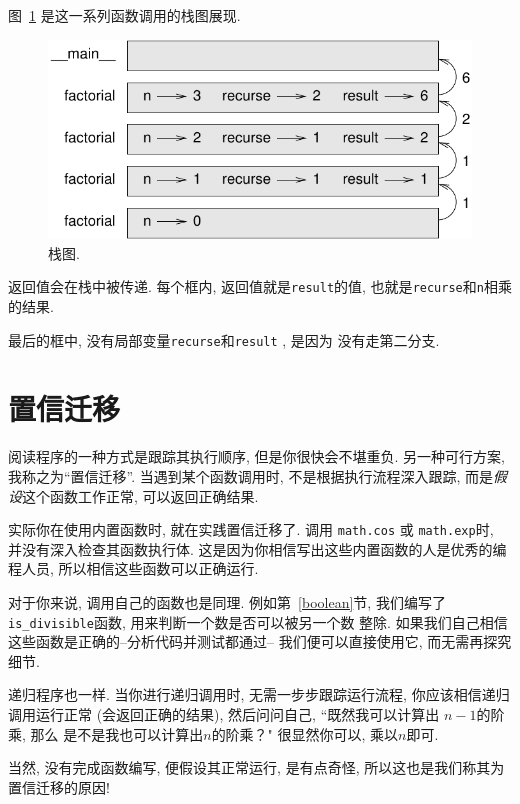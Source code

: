 \documentclass[10pt]{book}
\begin{document}
图~\ref{fig.stack3} 是这一系列函数调用的栈图展现.

\begin{figure}
\centerline
{\includegraphics[scale=0.8]{figs/stack3.pdf}}
\caption{栈图.}
\label{fig.stack3}
\end{figure}

返回值会在栈中被传递. 
每个框内, 返回值就是{\tt result}的值, 也就是{\tt recurse}和{\tt n}相乘的结果. 

最后的框中, 没有局部变量{\tt recurse}和{\tt result} , 是因为
没有走第二分支. 

\section{置信迁移}

阅读程序的一种方式是跟踪其执行顺序, 但是你很快会不堪重负. 
另一种可行方案, 我称之为``置信迁移''. 当遇到某个函数调用时, 
不是根据执行流程深入跟踪, 
而是{\em 假设}这个函数工作正常, 可以返回正确结果. 

实际你在使用内置函数时, 就在实践置信迁移了. 调用
{\tt math.cos} 或 {\tt math.exp}时, 并没有深入检查其函数执行体. 
这是因为你相信写出这些内置函数的人是优秀的编程人员, 
所以相信这些函数可以正确运行. 

对于你来说, 调用自己的函数也是同理. 例如第~\ref{boolean}节, 
我们编写了\verb"is_divisible"函数, 用来判断一个数是否可以被另一个数
整除. 如果我们自己相信这些函数是正确的--分析代码并测试都通过--
我们便可以直接使用它, 而无需再探究细节. 

递归程序也一样. 当你进行递归调用时, 
无需一步步跟踪运行流程, 你应该相信递归调用运行正常
(会返回正确的结果), 然后问问自己, ``既然我可以计算出 $n-1$的阶乘, 那么
是不是我也可以计算出$n$的阶乘？" 很显然你可以, 乘以$n$即可. 

当然, 没有完成函数编写, 便假设其正常运行, 是有点奇怪, 
所以这也是我们称其为置信迁移的原因!
\end{document}
